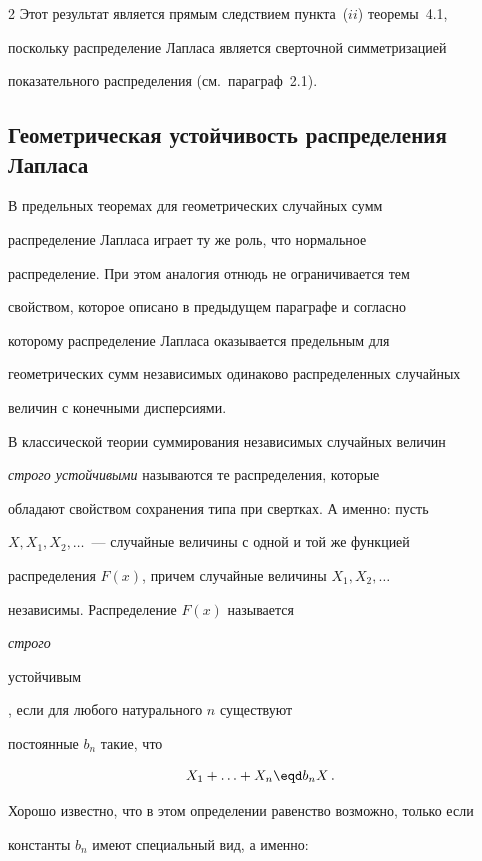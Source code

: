 \begin{multicols}{2}
Этот результат является прямым следствием пункта~($ii$) теоремы~4.1,


поскольку распределение Лапласа является сверточной симметризацией


показательного распределения (см.\ параграф~2.1).





\subsection{Геометрическая устойчивость распределения Лапласа}





В предельных теоремах для геометрических случайных сумм


распределение Лапласа играет ту же роль, что нормальное


распределение. При этом аналогия отнюдь не ограничивается тем


свойством, которое описано в предыдущем параграфе и согласно


которому распределение Лапласа оказывается предельным для


геометрических сумм независимых одинаково распределенных случайных


величин с конечными дисперсиями.





В классической теории суммирования независимых случайных величин


{\it строго устойчивыми} называются те распределения, которые


обладают свойством сохранения типа при свертках. А именно: пусть


$X,X_1,X_2,\ldots$~--- случайные величины с одной и той же функцией


распределения $F(x)$, причем случайные величины $X_1,X_2,\ldots$


независимы. Распределение $F(x)$ называется {\it строго


устойчивым}, если для любого натурального $n$ существуют


постоянные $b_n$ такие, что


$$


X_1+\ldots+X_n\eqd b_n X\,.


$$


Хорошо известно, что в этом определении равенство возможно, только если


константы $b_n$ имеют специальный вид, а именно:



\end{multicols}
